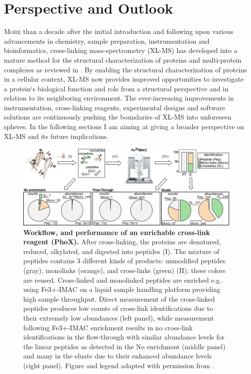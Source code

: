 \section{Perspective and Outlook}
\lettrine[lraise=0.1, nindent=0em, slope=-.5em]{M}{ore} than a decade after the initial introduction and following upon various advancements in chemistry, sample preparation, instrumentation and bioinformatics, cross-linking mass-spectrometry (XL-MS) has developed into a mature method for the structural characterization of proteins and multi-protein complexes as reviewed in \cite{RN8, RN7, RN6}. By enabling the structural characterization of proteins in a cellular context, XL-MS now provides improved opportunities to investigate a protein`s biological function and role from a structural perspective and in relation to its neighboring environment. The ever-increasing improvements in instrumentation, cross-linking reagents, experimental designs and software solutions are continuously pushing the boundaries of XL-MS into unforeseen spheres. In the following sections I am aiming at giving a broader perspective on XL-MS and its future implications.
\begin{figure}[hbt!]
    \center
    \includegraphics[width=\textwidth]{Chapter.6/Figures/Figure2.png}
    \caption{\textbf{Workflow, and performance of an enrichable cross-link reagent (PhoX).} After cross-linking, the proteins are denatured, reduced, alkylated, and digested into peptides (I). The mixture of peptides contains 3 different kinds of products: unmodified peptides (gray), monolinks (orange), and cross-links (green) (II); these colors are reused. Cross-linked and monolinked peptides are enriched e.g. using Fe3+-IMAC on a liquid sample handling platform providing high sample throughput. Direct measurement of the cross-linked peptides produces low counts of cross-link identifications due to their extremely low abundances (left panel), while measurement following Fe3+-IMAC enrichment results in no cross-link identifications in the flow-through with similar abundance levels for the linear peptides as detected in the No enrichment (middle panel) and many in the eluate due to their enhanced abundance levels (right panel). Figure and legend adapted with permission from \cite{RN4}.}
    \label{fig:ch6_fig2}
\end{figure}
